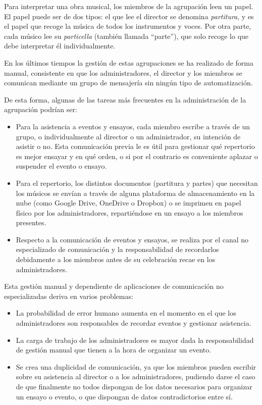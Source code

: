 Para interpretar una obra musical, los miembros de la agrupación leen un papel. El papel puede ser de dos tipos: el que lee el director se denomina \textit{partitura}, y es el papel que recoge la música de todos los instrumentos y voces. Por otra parte, cada músico lee su \textit{particella} (también llamada ``parte''), que solo recoge lo que debe interpretar él individualmente.

En los últimos tiempos la gestión de estas agrupaciones se ha realizado de forma manual, consistente en que los administradores, el director y los miembros se comunican mediante un grupo de mensajería sin ningún tipo de automatización.

De esta forma, algunas de las tareas más frecuentes en la administración de la agrupación podrían ser:

\begin{itemize}
    \item Para la asistencia a eventos y ensayos, cada miembro escribe a través de un grupo, o individualmente al director o un administrador, su intención de asistir o no. Esta comunicación previa le es útil para gestionar qué repertorio es mejor ensayar y en qué orden, o si por el contrario es conveniente aplazar o suspender el evento o ensayo.
    \item Para el repertorio, los distintos documentos (partitura y partes) que necesitan los músicos se envían a través de alguna plataforma de almacenamiento en la nube (como Google Drive, OneDrive o Dropbox) o se imprimen en papel físico por los administradores, repartiéndose en un ensayo a los miembros presentes.
    \item Respecto a la comunicación de eventos y ensayos, se realiza por el canal no especializado de comunicación y la responsabilidad de recordarlos debidamente a los miembros antes de su celebración recae en los administradores.
\end{itemize}

Esta gestión manual y dependiente de aplicaciones de comunicación no especializadas deriva en varios problemas:

\begin{itemize}
    \item La probabilidad de error humano aumenta en el momento en el que los administradores son responsables de recordar eventos y gestionar asistencia.
    \item La carga de trabajo de los administradores es mayor dada la responsabilidad de gestión manual que tienen a la hora de organizar un evento.
    \item Se crea una duplicidad de comunicación, ya que los miembros pueden escribir sobre su asistencia al director o a los administradores, pudiendo darse el caso de que finalmente no todos dispongan de los datos necesarios para organizar un ensayo o evento, o que dispongan de datos contradictorios entre sí.
\end{itemize}

